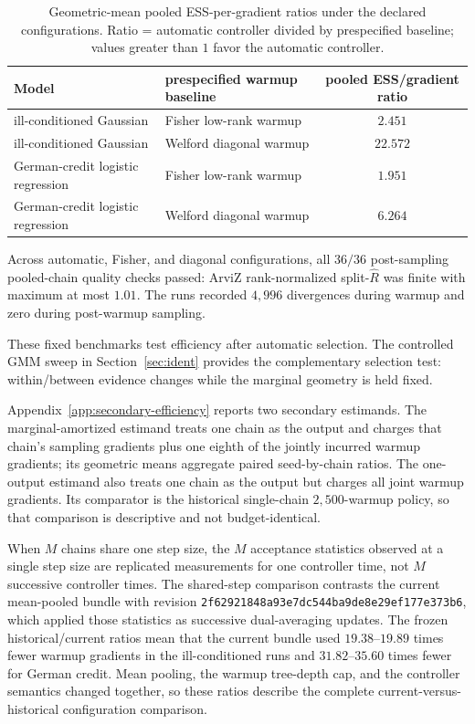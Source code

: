 \documentclass[11pt]{article}
\theoremstyle{plain}
\theoremstyle{definition}
\theoremstyle{remark}
\newcommand{\Rhat}{\widehat R}
\begin{document}
\begin{table}[htbp]\centering
\caption{Geometric-mean pooled ESS-per-gradient ratios under the declared
configurations. Ratio = automatic controller divided by prespecified baseline;
values greater than $1$ favor the automatic controller.}
\label{tab:eff}
\small
\begin{tabular}{@{}llc@{}}
\toprule
Model & prespecified warmup baseline & pooled ESS/gradient ratio \\
\midrule
ill-conditioned Gaussian & Fisher low-rank warmup & $2.451$ \\
ill-conditioned Gaussian & Welford diagonal warmup & $22.572$ \\
German-credit logistic regression & Fisher low-rank warmup & $1.951$ \\
German-credit logistic regression & Welford diagonal warmup & $6.264$ \\
\bottomrule
\end{tabular}
\end{table}

Across automatic, Fisher, and diagonal configurations, all $36/36$
post-sampling pooled-chain quality checks passed: ArviZ rank-normalized
split-$\Rhat$ \citep{vehtari2021rank} was finite with maximum at most $1.01$.
The runs recorded $4{,}996$ divergences during warmup and zero during
post-warmup sampling.

These fixed benchmarks test efficiency after automatic selection. The
controlled GMM sweep in Section~\ref{sec:ident} provides the complementary
selection test: within/between evidence changes while the marginal geometry is
held fixed.

Appendix~\ref{app:secondary-efficiency} reports two secondary estimands. The
marginal-amortized estimand treats one chain as the output and charges that
chain's sampling gradients plus one eighth of the jointly incurred warmup
gradients; its geometric means aggregate paired seed-by-chain ratios. The
one-output estimand also treats one chain as the output but charges all joint
warmup gradients. Its comparator is the historical single-chain
$2{,}500$-warmup policy, so that comparison is descriptive and not
budget-identical.

When $M$ chains share one step size, the $M$ acceptance statistics observed at a
single step size are replicated measurements for one controller time, not $M$
successive controller times. The shared-step comparison contrasts the current
mean-pooled bundle with revision
\nolinkurl{2f62921848a93e7dc544ba9de8e29ef177e373b6}, which applied those
statistics as successive dual-averaging updates. The frozen
historical/current ratios mean that the current bundle used
$19.38$--$19.89$ times fewer warmup gradients in the ill-conditioned runs and
$31.82$--$35.60$ times fewer for German credit. Mean pooling, the warmup
tree-depth cap, and the controller semantics changed together, so these ratios
describe the complete current-versus-historical configuration comparison.
\end{document}
